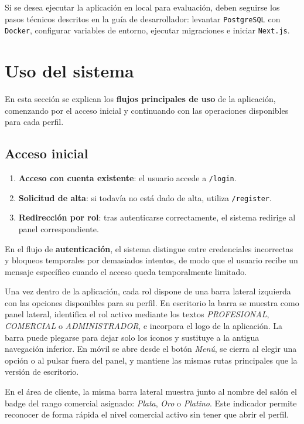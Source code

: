 Si se desea ejecutar la aplicación en local para evaluación, deben seguirse los pasos técnicos descritos en la guía de desarrollador: levantar \texttt{PostgreSQL} con \texttt{Docker}, configurar variables de entorno, ejecutar migraciones e iniciar \texttt{Next.js}.

\section{Uso del sistema}

En esta sección se explican los \textbf{flujos principales de uso} de la aplicación, comenzando por el acceso inicial y continuando con las operaciones disponibles para cada perfil.

\subsection{Acceso inicial}

\begin{enumerate}
    \item \textbf{Acceso con cuenta existente}: el usuario accede a \texttt{/login}.
    \item \textbf{Solicitud de alta}: si todavía no está dado de alta, utiliza \texttt{/register}.
    \item \textbf{Redirección por rol}: tras autenticarse correctamente, el sistema redirige al panel correspondiente.
\end{enumerate}

En el flujo de \textbf{autenticación}, el sistema distingue entre credenciales incorrectas y bloqueos temporales por demasiados intentos, de modo que el usuario recibe un mensaje específico cuando el acceso queda temporalmente limitado.

Una vez dentro de la aplicación, cada rol dispone de una barra lateral izquierda con las opciones disponibles para su perfil. En escritorio la barra se muestra como panel lateral, identifica el rol activo mediante los textos \textit{PROFESIONAL}, \textit{COMERCIAL} o \textit{ADMINISTRADOR}, e incorpora el logo de la aplicación. La barra puede plegarse para dejar solo los iconos y sustituye a la antigua navegación inferior. En móvil se abre desde el botón \textit{Menú}, se cierra al elegir una opción o al pulsar fuera del panel, y mantiene las mismas rutas principales que la versión de escritorio.

En el área de cliente, la misma barra lateral muestra junto al nombre del salón el badge del rango comercial asignado: \textit{Plata}, \textit{Oro} o \textit{Platino}. Este indicador permite reconocer de forma rápida el nivel comercial activo sin tener que abrir el perfil.

